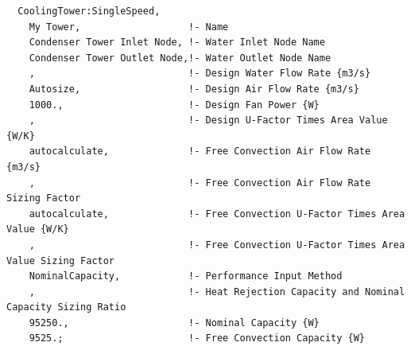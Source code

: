 \begin{lstlisting}
  CoolingTower:SingleSpeed,
    My Tower,                   !- Name
    Condenser Tower Inlet Node, !- Water Inlet Node Name
    Condenser Tower Outlet Node,!- Water Outlet Node Name
    ,                           !- Design Water Flow Rate {m3/s}
    Autosize,                   !- Design Air Flow Rate {m3/s}
    1000.,                      !- Design Fan Power {W}
    ,                           !- Design U-Factor Times Area Value {W/K}
    autocalculate,              !- Free Convection Air Flow Rate {m3/s}
    ,                           !- Free Convection Air Flow Rate Sizing Factor
    autocalculate,              !- Free Convection U-Factor Times Area Value {W/K}
    ,                           !- Free Convection U-Factor Times Area Value Sizing Factor
    NominalCapacity,            !- Performance Input Method
    ,                           !- Heat Rejection Capacity and Nominal Capacity Sizing Ratio
    95250.,                     !- Nominal Capacity {W}
    9525.;                      !- Free Convection Capacity {W}


\end{lstlisting}
